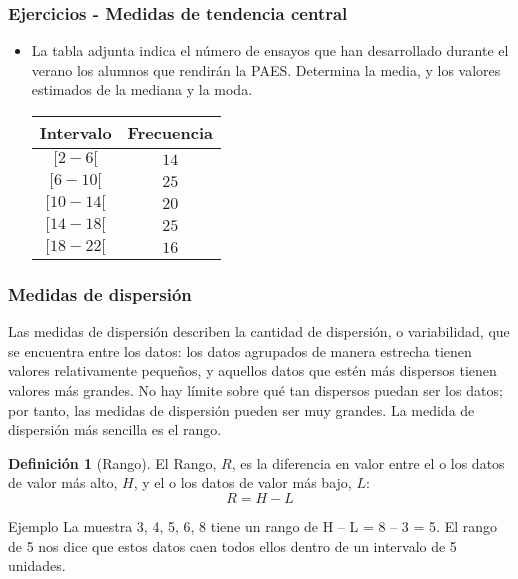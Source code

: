\documentclass[10pt]{beamer}
\theoremstyle{plain} %
\theoremstyle{definition}
\newtheorem{defn}{Definición}
\theoremstyle{remark}
\begin{document}
\begin{frame}
\frametitle{Ejercicios - Medidas de tendencia central}
\begin{itemize}
\item[1.]La tabla adjunta indica el número de ensayos que han desarrollado durante el verano los alumnos que rendirán la PAES. Determina la media, y los valores estimados de la mediana y la moda.\\

\begin{center}
\begin{tabular}{|c|c|}\hline
Intervalo & Frecuencia\\ \hline
$[2-6[$&$14$\\ \hline
$[6-10[$&$25$\\ \hline
$[10-14[$&$20$\\ \hline
$[14-18[$&$25$\\ \hline
$[18-22[$&$16$\\ \hline

\end{tabular}
\end{center}
\end{itemize}
\end{frame}

\begin{frame}
\frametitle{Medidas de dispersión}
Las medidas de dispersión describen la cantidad de dispersión, o variabilidad, que se encuentra entre los datos: los datos agrupados de manera estrecha tienen valores relativamente pequeños, y aquellos datos que estén más dispersos tienen valores más grandes. No hay límite sobre qué tan dispersos puedan ser los datos; por tanto, las medidas de dispersión pueden ser muy grandes. La medida de dispersión más sencilla es el rango. 
\begin{defn}[Rango]
El Rango, $R$, es la diferencia en valor entre el o los datos de valor más alto, $H$, y el o los datos de valor más bajo, $L$:
$$R=H-L$$
\end{defn}
\begin{exampleblock}{Ejemplo}
La muestra 3, 4, 5, 6, 8 tiene un rango de H – L = 8 – 3 = 5. El rango de 5 nos dice que estos datos caen todos ellos dentro de un intervalo de 5 unidades.
\end{exampleblock}
\end{frame}
\end{document}
